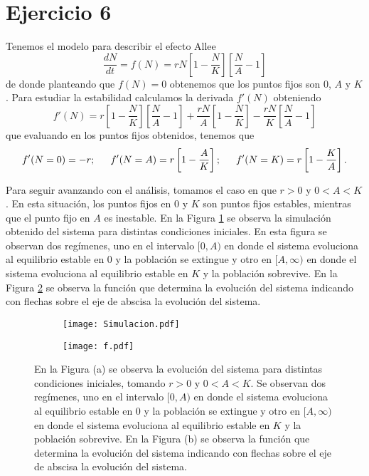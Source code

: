 \section*{Ejercicio 6}
\graphicspath{{Figuras/ej_06/}}

Tenemos el modelo para describir el efecto Allee
\begin{equation}
    \frac{dN}{dt} = f(N) = r N \left[ 1 - \frac{N}{K} \right] \left[ \frac{N}{A} -1 \right]
\end{equation}
de donde planteando que $f(N) = 0$ obtenemos que los puntos fijos son 0, $A$ y $K$. Para estudiar la estabilidad calculamos la derivada $f'(N)$ obteniendo
\begin{equation}
    f'(N) = r \left[ 1-\frac{N}{K} \right] \left[ \frac{N}{A} -1 \right] + \frac{rN}{A} \left[ 1 - \frac{N}{K} \right] - \frac{rN}{K} \left[ \frac{N}{A}-1\right]
\end{equation}
que evaluando en los puntos fijos obtenidos, tenemos que
\begin{equation}
    f'(N=0) = -r; \indent f'(N=A)=r\left[1-\frac{A}{K}\right]; \indent f'(N=K)=r\left[1-\frac{K}{A}\right]. 
\end{equation}

Para seguir avanzando con el análisis, tomamos el caso en que $r>0$ y $0<A<K$. En esta situación, los puntos fijos en $0$ y $K$ son puntos fijos estables, mientras que el punto fijo en $A$ es inestable. En la Figura \ref{06_Simulacion} se observa la simulación obtenido del sistema para distintas condiciones iniciales. En esta figura se observan dos regímenes, uno en el intervalo $[0,A)$ en donde el sistema evoluciona al equilibrio estable en $0$ y la población se extingue y otro en $[A,\infty)$ en donde el sistema evoluciona al equilibrio estable en $K$ y la población sobrevive. En la Figura \ref{06_Funcion_y_raices} se observa la función que determina la evolución del sistema indicando con flechas sobre el eje de abscisa la evolución del sistema.

\begin{figure}[hb!]
    \centering
    \begin{subfigure}[b]{0.49\textwidth}
        \texttt{[image: Simulacion.pdf]}
        \caption{}
        \label{06_Simulacion}
    \end{subfigure}
    \begin{subfigure}[b]{0.49\textwidth}
        \texttt{[image: f.pdf]}
        \caption{}
        \label{06_Funcion_y_raices}
    \end{subfigure}
    \caption{En la Figura (a) se observa la evolución del sistema para distintas condiciones iniciales, tomando $r>0$ y $0<A<K$. Se observan dos regímenes, uno en el intervalo $[0,A)$ en donde el sistema evoluciona al equilibrio estable en $0$ y la población se extingue y otro en $[A,\infty)$ en donde el sistema evoluciona al equilibrio estable en $K$ y la población sobrevive. En la Figura (b) se observa la función que determina la evolución del sistema indicando con flechas sobre el eje de abscisa la evolución del sistema. }
    \label{06_ejercicio}
\end{figure}

